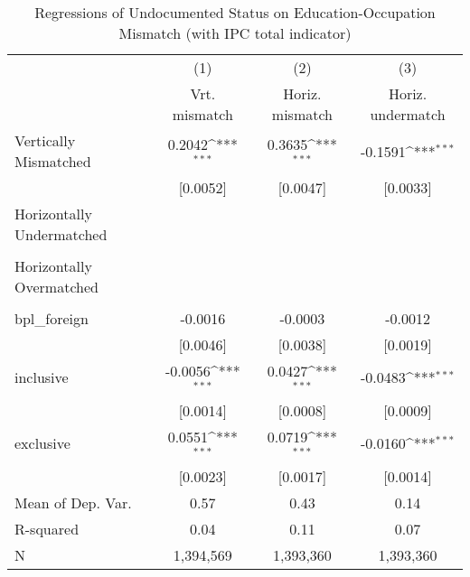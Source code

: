 \begin{table}[htbp]\centering
\def\sym#1{\ifmmode^{#1}\else\(^{#1}\)\fi}
\caption{Regressions of Undocumented Status on Education-Occupation Mismatch (with IPC total indicator)}
\begin{tabular}{l*{3}{c}}
\toprule
                    &\multicolumn{1}{c}{(1)}         &\multicolumn{1}{c}{(2)}         &\multicolumn{1}{c}{(3)}         \\
                    &Vrt. mismatch         &Horiz. mismatch         &Horiz. undermatch         \\
\midrule
Vertically Mismatched&      0.2042\sym{***}&      0.3635\sym{***}&     -0.1591\sym{***}\\
                    &    [0.0052]         &    [0.0047]         &    [0.0033]         \\
\addlinespace
Horizontally Undermatched&                     &                     &                     \\
                    &                     &                     &                     \\
\addlinespace
Horizontally Overmatched&                     &                     &                     \\
                    &                     &                     &                     \\
\addlinespace
bpl\_foreign         &     -0.0016         &     -0.0003         &     -0.0012         \\
                    &    [0.0046]         &    [0.0038]         &    [0.0019]         \\
\addlinespace
inclusive           &     -0.0056\sym{***}&      0.0427\sym{***}&     -0.0483\sym{***}\\
                    &    [0.0014]         &    [0.0008]         &    [0.0009]         \\
\addlinespace
exclusive           &      0.0551\sym{***}&      0.0719\sym{***}&     -0.0160\sym{***}\\
                    &    [0.0023]         &    [0.0017]         &    [0.0014]         \\
\midrule
Mean of Dep. Var.   &        0.57         &        0.43         &        0.14         \\
R-squared           &        0.04         &        0.11         &        0.07         \\
N                   &   1,394,569         &   1,393,360         &   1,393,360         \\

\end{tabular}
\end{table}
